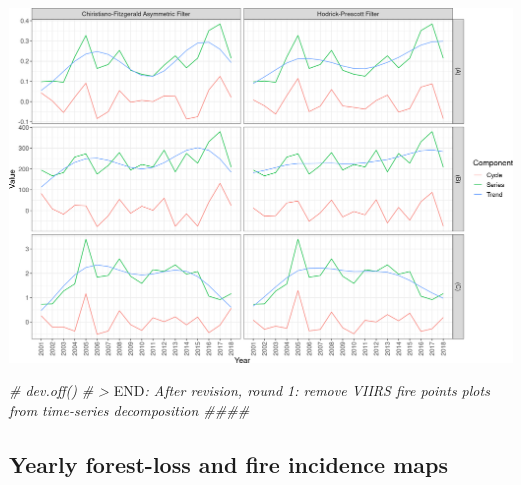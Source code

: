 \documentclass[10pt,landscape,a3paper]{article}
\newenvironment{Shaded}{\begin{snugshade}}{\end{snugshade}}
\newcommand{\CommentTok}[1]{\textcolor[rgb]{0.56,0.35,0.01}{\textit{#1}}}
\newcommand{\RegionMarkerTok}[1]{#1}
\begin{document}
\begin{center}\includegraphics{img/modelling/aa-eda-ts-23} \end{center}

\begin{Shaded}
\begin{Highlighting}[]
\CommentTok{\# dev.off()}
\CommentTok{\# \textgreater{} }\RegionMarkerTok{END}\CommentTok{: After revision, round 1: remove VIIRS fire points plots from time{-}series decomposition \#\#\#\#}
\end{Highlighting}
\end{Shaded}

\hypertarget{yearly-forest-loss-and-fire-incidence-maps}{%
\subsection{Yearly forest-loss and fire incidence
maps}\label{yearly-forest-loss-and-fire-incidence-maps}}
\end{document}
